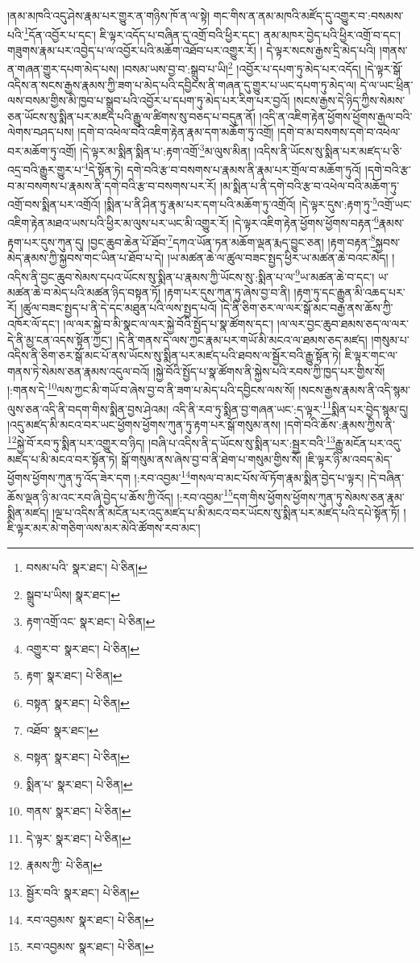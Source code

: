 །ནམ་མཁའི་འདུ་ཤེས་རྣམ་པར་གྱུར་ན་གཉིས་ཁོ་ན་ལ་སྟེ། གང་གིས་ན་ནམ་མཁའི་མཛོད་དུ་འགྱུར་བ་:བསམས་པའི་\footnote{བསམ་པའི་  སྣར་ཐང་།  པེ་ཅིན། }དོན་འབྱོར་པ་དང་། ཇི་ལྟར་འདོད་པ་བཞིན་དུ་འགྲོ་བའི་ཕྱིར་དང་། ནམ་མཁར་བྱེད་པའི་ཕྱིར་འགྲོ་བ་དང་། གཟུགས་རྣམ་པར་འབྱེད་པ་ལ་འབྱོར་པའི་མཆོག་འཐོབ་པར་འགྱུར་རོ། །
དེ་ལྟར་སངས་རྒྱས་དྲི་མེད་པའི། །གནས་ན་གཞན་གྱུར་དཔག་མེད་པས། །བསམ་ཡས་བྱ་བ་:སྒྲུབ་པ་ཡི།\footnote{སྒྲུབ་པ་ཡིས།  སྣར་ཐང་། } །འབྱོར་པ་དཔག་ཏུ་མེད་པར་འདོད། །དེ་ལྟར་སྒོ་འདིས་ན་སངས་རྒྱས་རྣམས་ཀྱི་ཟག་པ་མེད་པའི་དབྱིངས་ནི་གཞན་དུ་གྱུར་པ་ཡང་དཔག་ཏུ་མེད་ལ། དེ་ལ་ཡང་ཕྲིན་ལས་བསམ་གྱིས་མི་ཁྱབ་པ་སྒྲུབ་པའི་འབྱོར་པ་དཔག་ཏུ་མེད་པར་རིག་པར་བྱའོ། །སངས་རྒྱས་དེ་ཉིད་ཀྱིས་སེམས་ཅན་ཡོངས་སུ་སྨིན་པར་མཛད་པའི་རྒྱུ་ལ་ཚིགས་སུ་བཅད་པ་བདུན་ནོ། །འདི་ན་འཇིག་རྟེན་ཕྱོགས་ཕྱོགས་རྒྱལ་བའི་ལེགས་བཤད་པས། །དགེ་བ་འཕེལ་བའི་འཇིག་རྟེན་རྣམ་དག་མཆོག་ཏུ་འགྲོ། །དགེ་བ་མ་བསགས་དགེ་བ་འཕེལ་བར་མཆོག་ཏུ་འགྲོ། །དེ་ལྟར་མ་སྨིན་སྨིན་པ་:རྟག་འགྲོ་\footnote{རྟག་འགྲོ་འང་  སྣར་ཐང་།  པེ་ཅིན། }མ་ལུས་མིན། །འདིས་ནི་ཡོངས་སུ་སྨིན་པར་མཛད་པ་ཅི་འདྲ་བའི་རྒྱུར་གྱུར་པ་\footnote{འགྱུར་བ་  སྣར་ཐང་།  པེ་ཅིན། }དེ་སྟོན་ཏེ། དགེ་བའི་རྩ་བ་བསགས་པ་རྣམས་ནི་རྣམ་པར་གྲོལ་བ་མཆོག་ཏུའོ། །དགེ་བའི་རྩ་བ་མ་བསགས་པ་རྣམས་ནི་དགེ་བའི་རྩ་བ་བསགས་པར་རོ། །མ་སྨིན་པ་ནི་དགེ་བའི་རྩ་བ་འཕེལ་བའི་མཆོག་ཏུ་འགྲོ་བས་སྨིན་པར་འགྲོའོ། །སྨིན་པ་ནི་ཤིན་ཏུ་རྣམ་པར་དག་པའི་མཆོག་ཏུ་འགྲོའོ། །དེ་ལྟར་དུས་:རྟག་ཏུ་\footnote{རྟག་  སྣར་ཐང་།  པེ་ཅིན། }འགྲོ་ཡང་འཇིག་རྟེན་མཐའ་ཡས་པའི་ཕྱིར་མ་ལུས་པར་ཡང་མི་འགྱུར་རོ། །དེ་ལྟར་འཇིག་རྟེན་ཕྱོགས་ཕྱོགས་བརྟན་\footnote{བསྟན་  སྣར་ཐང་།  པེ་ཅིན། }རྣམས་རྟག་པར་དུས་ཀུན་དུ། །བྱང་ཆུབ་ཆེན་པོ་ཐོབ་\footnote{འཐོབ་  སྣར་ཐང་། }དཀའ་ཡོན་ཏན་མཆོག་ལྡན་རྨད་བྱུང་ཅན། །རྟག་བརྟན་\footnote{བསྟན་  སྣར་ཐང་།  པེ་ཅིན། }སྐྱབས་མེད་རྣམས་ཀྱི་སྐྱབས་གང་ཡིན་པ་ཐོབ་པ་དེ། །ཡ་མཚན་ཆེ་ལ་ཚུལ་བཟང་སྤྱད་ཕྱིར་ཡ་མཚན་ཆེ་བའང་མེད། །འདིས་ནི་བྱང་ཆུབ་སེམས་དཔའ་ཡོངས་སུ་སྨིན་པ་རྣམས་ཀྱི་ཡོངས་སུ་:སྨིན་པ་ལ་\footnote{སྨིན་པ་  སྣར་ཐང་།  པེ་ཅིན། }ཡ་མཚན་ཆེ་བ་དང་། ཡ་མཚན་ཆེ་བ་མེད་པའི་མཚན་ཉིད་བསྟན་ཏོ། །རྟག་པར་དུས་ཀུན་ཏུ་ཞེས་བྱ་བ་ནི། །རྟག་ཏུ་དང་རྒྱུན་མི་འཆད་པར་རོ། །ཚུལ་བཟང་སྤྱད་པ་ནི་དེ་དང་མཐུན་པའི་ལས་སྤྱད་པའོ། །དེ་ནི་ཅིག་ཅར་ལ་ལར་སྒོ་མང་བརྒྱ་ནས་ཆོས་ཀྱི་འཁོར་ལོ་དང་། །ལ་ལར་སྐྱེ་བ་མི་སྣང་ལ་ལར་སྐྱེ་བོའི་སྤྱོད་པ་སྣ་ཚོགས་དང་། །ལ་ལར་བྱང་ཆུབ་ཐམས་ཅད་ལ་ལར་དེ་ནི་མྱ་ངན་འདས་སྟོན་ཀྱང་། །དེ་ནི་གནས་དེ་ལས་ཀྱང་རྣམ་པར་གཡོ་མི་མངའ་ལ་ཐམས་ཅད་མཛད། །གསུམ་པ་འདིས་ནི་ཅིག་ཅར་སྒོ་མང་པོ་ནས་ཡོངས་སུ་སྨིན་པར་མཛད་པའི་ཐབས་ལ་སྦྱོར་བའི་རྒྱུ་སྟོན་ཏེ། ཇི་ལྟར་གང་ལ་གནས་ཏེ་སེམས་ཅན་རྣམས་འདུལ་བའོ། །སྐྱེ་བོའི་སྤྱོད་པ་སྣ་ཚོགས་ནི་སྐྱེས་པའི་རབས་ཀྱི་ཁྱད་པར་གྱིས་སོ། །:གནས་དེ་\footnote{གནས་  སྣར་ཐང་།  པེ་ཅིན། }ལས་ཀྱང་མི་གཡོ་བ་ཞེས་བྱ་བ་ནི་ཟག་པ་མེད་པའི་དབྱིངས་ལས་སོ། །སངས་རྒྱས་རྣམས་ནི་འདི་སྙམ་ལུས་ཅན་འདི་ནི་བདག་གིས་སྨིན་བྱས་ཤེའམ། འདི་ནི་རབ་ཏུ་སྨིན་བྱ་གཞན་ཡང་:ད་ལྟར་\footnote{དེ་ལྟར་  སྣར་ཐང་།  པེ་ཅིན། }སྨིན་པར་བྱེད་སྙམ་དུ། །འདུ་མཛད་མི་མངའ་བར་ཡང་ཕྱོགས་ཕྱོགས་ཀུན་ཏུ་རྟག་པར་སྒོ་གསུམ་ནས། །དགེ་བའི་ཆོས་:རྣམས་ཀྱིས་ནི་\footnote{རྣམས་ཀྱི་  པེ་ཅིན། }སྐྱེ་བོ་རབ་ཏུ་སྨིན་པར་འགྱུར་བ་ཉིད། །བཞི་པ་འདིས་ནི་ད་ཡོངས་སུ་སྨིན་པར་:སྦྱར་བའི་\footnote{སྦྱོར་བའི་  སྣར་ཐང་།  པེ་ཅིན། }རྒྱུ་མངོན་པར་འདུ་མཛད་པ་མི་མངའ་བར་སྟོན་ཏེ། སྒོ་གསུམ་ནས་ཞེས་བྱ་བ་ནི་ཐེག་པ་གསུམ་གྱིས་སོ། །ཇི་ལྟར་ཉི་མ་འབད་མེད་ཕྱོགས་ཕྱོགས་ཀུན་ཏུ་འོད་ཟེར་དག །:རབ་འབྱམ་\footnote{རབ་འབྱམས་  སྣར་ཐང་།  པེ་ཅིན། }གསལ་བ་མང་པོས་ལོ་ཏོག་རྣམ་སྨིན་བྱེད་པ་ལྟར། །དེ་བཞིན་ཆོས་ལྡན་ཉི་མ་འང་རབ་ཞི་བྱེད་པ་ཆོས་ཀྱི་འོད། །:རབ་འབྱམ་\footnote{རབ་འབྱམས་  སྣར་ཐང་།  པེ་ཅིན། }དག་གིས་ཕྱོགས་ཕྱོགས་ཀུན་ཏུ་སེམས་ཅན་རྣམ་སྨིན་མཛད། །ལྔ་པ་འདིས་ནི་མངོན་པར་འདུ་མཛད་པ་མི་མངའ་བར་ཡོངས་སུ་སྨིན་པར་མཛད་པའི་དཔེ་སྟོན་ཏོ། །ཇི་ལྟར་མར་མེ་གཅིག་ལས་མར་མེའི་ཚོགས་རབ་མང་། 